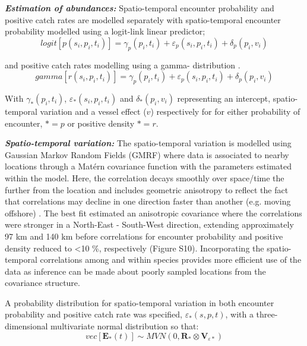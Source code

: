 \documentclass{nature}
\begin{document}
\begin{linenumbers}
\textbf{\textit{Estimation of abundances:}} Spatio-temporal encounter
probability and positive catch rates are modelled separately with
spatio-temporal encounter probability modelled using a logit-link linear
predictor;
		\begin{equation}
			logit[p(s_{i},p_{i},t_{i})] = \gamma_{p}(p_{i},t_{i}) +
			\varepsilon_{p}(s_{i},p_{i},t_{i}) + \delta_{p}(p_{i},
			v_{i})
		\end{equation}

and positive catch rates modelling using a gamma- distribution \cite{Thorson2015a}.  
		\begin{equation}
			gamma[r(s_{i},p_{i},t_{i})] = \gamma_{p}(p_{i},t_{i}) +
			\varepsilon_{p}(s_{i},p_{i},t_{i}) + \delta_{p}(p_{i},
			v_{i})
		\end{equation}

With $\gamma_{*}(p_{i},t_{i})$, $\varepsilon_{*}(s_{i},p_{i},t_{i})$ and
$\delta_{*}(p_{i}, v_{i})$ representing an intercept, spatio-temporal variation
and a vessel effect ($v$) respectively for for either probability of encounter,
$* = p$ or positive density $* = r$.

\textbf{\textit{Spatio-temporal variation:}} The spatio-temporal variation is
modelled using Gaussian Markov Random Fields (GMRF) where data is associated to
nearby locations through a Matérn covariance function with the parameters
estimated within the model. Here, the correlation decays smoothly over
space/time the further from the location and includes geometric anisotropy to
reflect the fact that correlations may decline in one direction faster than
another (e.g. moving offshore) \cite{Thorson2013}.  The best fit estimated an
anisotropic covariance where the correlations were stronger in a North-East -
South-West direction, extending approximately 97 km and 140 km before
correlations for encounter probability and positive density reduced to
\textless 10 \%, respectively (Figure S10).  Incorporating the spatio-temporal
correlations among and within species provides more efficient use of the data
as inference can be made about poorly sampled locations from the covariance
structure.

A probability distribution for spatio-temporal variation in both encounter
probability and positive catch rate was specified, $\varepsilon_{*}(s,p,t)$,
with a three-dimensional multivariate normal distribution so that:
	\begin{equation}
		vec[\mathbf{E}_{*}(t)] \sim MVN(0,\mathbf{R}_{*} \otimes
		\mathbf{V}_{{\varepsilon}{*}})
	\end{equation}


\end{linenumbers}
\end{document}
